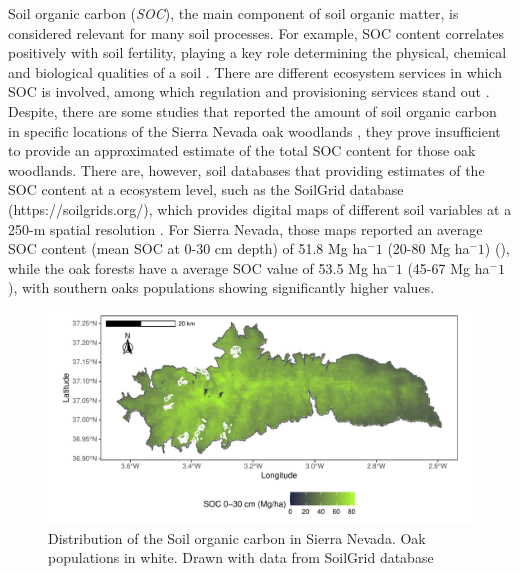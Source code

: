 Soil organic carbon (\emph{SOC}), the main component of soil organic matter, is considered relevant for many soil processes. For example, SOC content correlates positively with soil fertility, playing a key role determining the physical, chemical and biological qualities of a soil \autocites{Victoriaetal2012BenefitsSoil}. There are different ecosystem services in which SOC is involved, among which regulation and provisioning services stand out \autocites{Francavigliaetal2018OrganicCarbon}. Despite, there are some studies that reported the amount of soil organic carbon in specific locations of the Sierra Nevada oak woodlands \autocites{CoboDiazetal2017TaxonomicFunctional,Lasaetal2019BacteriaEndosphere}, they prove insufficient to provide an approximated estimate of the total SOC content for those oak woodlands. There are, however, soil databases that providing estimates of the SOC content at a ecosystem level, such as the SoilGrid database (https://soilgrids.org/), which provides digital maps of different soil variables at a 250-m spatial resolution \autocites{Hengletal2017SoilGrids250mGlobal,Batjesetal2017WoSISProviding,Batjesetal2020StandardisedSoil}. For Sierra Nevada, those maps reported an average SOC content (mean SOC at 0-30 cm depth) of 51.8 Mg ha$^-1$ (20-80 Mg ha$^-1$) (), while the oak forests have a average SOC value of 53.5 Mg ha$^-1$ (45-67 Mg ha$^-1$), with southern oaks populations showing significantly higher values. 

\begin{figure}
    \centering
    \includegraphics[width=\textwidth]{img/es/es-soc.pdf}\caption{Distribution of the Soil organic carbon in Sierra Nevada. Oak populations in white. Drawn with data from SoilGrid database \autocites[see][]{Hengletal2017SoilGrids250mGlobal}}\label{fig:es:soc}
\end{figure}

